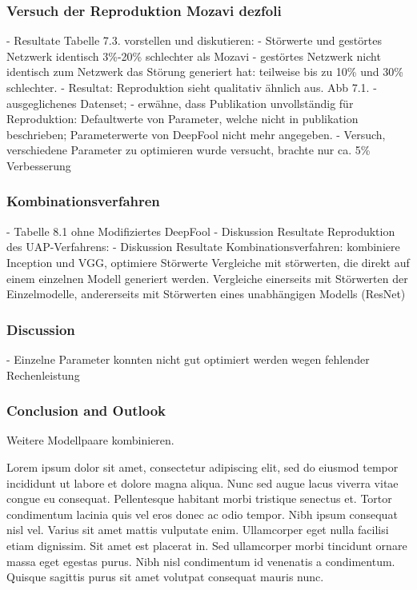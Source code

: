 \documentclass[runningheads]{llncs}
\begin{document}
\subsubsection{Versuch der Reproduktion Mozavi dezfoli}
		- Resultate Tabelle 7.3. vorstellen und diskutieren:
			- Störwerte und gestörtes Netzwerk identisch 3\%-20\% schlechter als Mozavi
			- gestörtes Netzwerk nicht identisch zum Netzwerk das Störung generiert hat: teilweise bis zu 10\% und 30\% schlechter. 
		- Resultat: Reproduktion sieht qualitativ ähnlich aus. Abb 7.1.
		- ausgeglichenes Datenset; 
		- erwähne, dass Publikation unvollständig für Reproduktion: Defaultwerte von Parameter, welche nicht in publikation beschrieben; Parameterwerte von DeepFool nicht mehr angegeben.
		- Versuch, verschiedene Parameter zu optimieren wurde versucht, brachte nur ca. 5\% Verbesserung
\subsubsection{Kombinationsverfahren}
- Tabelle	8.1 ohne Modifiziertes DeepFool
- Diskussion Resultate Reproduktion des UAP-Verfahrens: 
- Diskussion Resultate Kombinationsverfahren: kombiniere Inception und VGG, optimiere Störwerte
Vergleiche mit störwerten, die direkt auf einem einzelnen Modell generiert werden. Vergleiche einerseits mit Störwerten der Einzelmodelle, andererseits mit Störwerten eines unabhängigen Modells (ResNet)

\subsubsection{Discussion}
- Einzelne Parameter konnten nicht gut optimiert werden wegen fehlender Rechenleistung
\subsubsection{Conclusion and Outlook}
Weitere Modellpaare kombinieren.


Lorem ipsum dolor sit amet, consectetur adipiscing elit, sed do eiusmod tempor incididunt ut labore et dolore magna aliqua. Nunc sed augue lacus viverra vitae congue eu consequat. Pellentesque habitant morbi tristique senectus et. Tortor condimentum lacinia quis vel eros donec ac odio tempor. Nibh ipsum consequat nisl vel. Varius sit amet mattis vulputate enim. Ullamcorper eget nulla facilisi etiam dignissim. Sit amet est placerat in. Sed ullamcorper morbi tincidunt ornare massa eget egestas purus. Nibh nisl condimentum id venenatis a condimentum. Quisque sagittis purus sit amet volutpat consequat mauris nunc.
\end{document}
